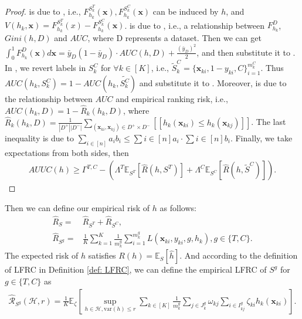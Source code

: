 \documentclass{article}
\def\vx{{\mathbf{x}}}
\def\eE{\mathbb{E}}
\begin{document}
\begin{proof}
 is due to \cite{aminiKDD2021uplift_Modeling,KDD2011_Ffunction}, i.e.,  $F_{h_k}^{S^T_k}(\vx), F_{h_k}^{S^C_k}(\vx)$ can be induced by $h$, and $V(h_k,\vx) = F_{h_k}^{S^T_k}(x) - F_{h_k}^{S^C_k}(\vx)$.  is due to \cite{aminiKDD2021uplift_Modeling,KDD2011_ginifunction}, i.e., a relationship between $F_{h_k}^D$, $Gini(h, D)$ and $AUC$, where D represents a dataset. Then we can get $\int_{0}^{1} F_{h_k}^D(\vx) d \vx = \bar{y}_D (1-\bar{y}_D) \cdot AUC (h,D) + \frac{(\bar{y}_D)^2}{2} $, and then substitute it to . In , we revert labels in $S^C_k$ for $\forall k \in [K]$, i.e., $\widetilde{S}_k^C = \{\vx_{ki},1-y_{ki},C \}_{i=1}^{m_k^C}$. Thus $AUC(h_k,S_k^C) = 1 - AUC (h_k, \widetilde{S_k^C})$ and substitute it to . Moreover,  is due to the relationship between $AUC$ and empirical ranking risk, i.e., $AUC(h_k,D) = 1-\hat{R}_k(h_k,D)$, where $\hat{R}_k (h_k,D) = \frac{1}{|D^+||D^-|} \sum_{(\vx_{ki},\vx_{kj}) \in D^+ \times D^-} [\! [h_k(\vx_{ki}) \leq h_k(\vx_{kj})]\!] $. The last inequality  is due to $\sum_{i \in [n]} a_i b_i \leq \sum{i \in [n]} a_i \cdot \sum{i \in [n]} b_i$. 
Finally, we take expectations from both sides, then
\begin{align*}
    AUUC (h) \geq \Gamma^{T,C} -  \left( \Lambda^T \eE_{S^T} [ \hat{R}(h,S^T) ] + \Lambda^C \eE_{S^C} [ \hat{R}(h,\widetilde{S}^C) ] \right).
\end{align*}
\end{proof}


Then we can define our empirical risk of $h$ as follows:
\begin{align*}
    \hat{R}_S = & \hat{R}_{S^T} + \hat{R}_{S^C}, \\
    \hat{R}_{S^g} = & \frac{1}{K} \sum_{k =1}^K \frac{1}{m_k^g} \sum_{i=1}^{m_k^g} L(\vx_{ki},y_{ki},g,h_k), g \in \{ T,C \}. 
\end{align*}
The expected risk of $h$ satisfies $R(h)=\eE _S[\hat{h}]$. And according to the definition of LFRC in Definition \ref{def: LFRC}, we can define the empirical LFRC of $S^g$ for $g \in \{ T,C \}$ as
\begin{align*}
    \hat{\mathcal{R}}_{S^g}(\mathcal{H},r) =  \frac{1}{K} \eE_{\zeta} \left[ \sup_{h \in \mathcal{H},\mathrm{var}(h) \leq r} \sum_{k \in [K]} \frac{1}{m_k^g} \sum_{j \in J_k^g} \omega_{kj} \sum_{i \in I_{kj}^g} \zeta_{ki} h_k(\vx_{ki}) \right].
\end{align*}
\end{document}
